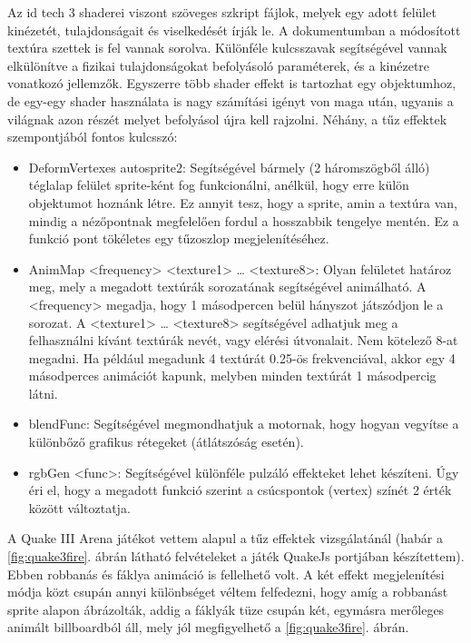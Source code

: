 Az id tech 3 shaderei viszont szöveges szkript fájlok, melyek egy adott felület kinézetét, tulajdonságait és viselkedését írják le. A dokumentumban a módosított textúra szettek is fel vannak sorolva. Különféle kulcsszavak segítségével vannak elkülönítve a fizikai tulajdonságokat befolyásoló paraméterek, és a kinézetre vonatkozó jellemzők. Egyszerre több shader effekt is tartozhat egy objektumhoz, de egy-egy shader használata is nagy számítási igényt von maga után, ugyanis a világnak azon részét melyet befolyásol újra kell rajzolni. \cite{quake3shaderManual} Néhány, a tűz effektek szempontjából fontos kulcsszó: 
\begin{itemize} 
\item
DeformVertexes autosprite2: Segítségével bármely (2 háromszögből álló) téglalap felület sprite-ként fog funkcionálni, anélkül, hogy erre külön objektumot hoznánk létre. Ez annyit tesz, hogy a sprite, amin a textúra van, mindig a nézőpontnak megfelelően fordul a hosszabbik tengelye mentén. Ez a funkció pont tökéletes egy tűzoszlop megjelenítéséhez.
\item
AnimMap <frequency> <texture1> … <texture8>: Olyan felületet határoz meg, mely a megadott textúrák sorozatának segítségével animálható. A <frequency> megadja, hogy 1 másodpercen belül hányszot játszódjon le a sorozat. A <texture1> … <texture8> segítségével adhatjuk meg a felhasználni kívánt textúrák nevét, vagy elérési útvonalait. Nem kötelező 8-at megadni. Ha például megadunk 4 textúrát 0.25-ös frekvenciával, akkor egy 4 másodperces animációt kapunk, melyben minden textúrát 1 másodpercig látni. 
\item
blendFunc: Segítségével megmondhatjuk a motornak, hogy hogyan vegyítse a különbőző grafikus rétegeket (átlátszóság esetén).
\item
rgbGen <func>: Segítségével különféle pulzáló effekteket lehet készíteni. Úgy éri el, hogy a megadott funkció szerint a csúcspontok (vertex) színét 2 érték között változtatja.
\end{itemize} 
 \cite{quake3shaderManual}

A Quake III Arena játékot vettem alapul a tűz effektek vizsgálatánál (habár a \ref{fig:quake3fire}. ábrán látható felvételeket a játék QuakeJs portjában készítettem). Ebben robbanás és fáklya animáció is fellelhető volt. A két effekt megjelenítési módja közt csupán annyi különbséget véltem felfedezni, hogy amíg a robbanást sprite alapon ábrázolták, addig a fáklyák tüze csupán két, egymásra merőleges animált billboardból áll, mely jól megfigyelhető a \ref{fig:quake3fire}. ábrán. 

